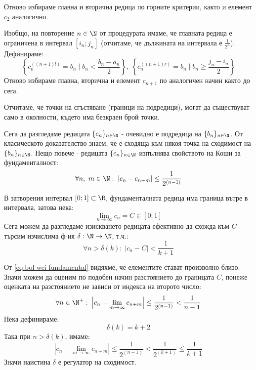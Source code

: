 \begin{solution}
    Отново избираме главна и вторична редица по горните критерии, както и елемент $c_2$ аналогично.

    Изобщо, на повторение $n \in \N$ от процедурата имаме, че главната редица е ограничена в интервал $[i_n; j_n]$ (отчитаме, че дължината на интервала е $\frac{1}{2^n}$). Дефинираме:
    \begin{equation}
        \left\{c^{((n+1)l)}_n = b_n \mid b_n < \frac{b_n-a_n}{2}\right\},\  \left\{c^{((n+1)r)}_n = b_n \mid b_n \geq \frac{j_n-i_n}{2}\right\}
    \end{equation}
    Отново избираме главна, вторична и елемент $c_{n+1}$ по аналогичен начин както до сега.

    Отчитаме, че точки на сгъстяване (граници на подредици), могат да съществуват само в околности, където има безкраен брой точки.
    
    Сега да разгледаме редицата $\{c_n\}_{n\in\N}$ - очевидно е подредица на $\{b_n\}_{n\in\N}$. От класическото доказателство знаем, че е сходяща към някоя точка на сходимост на $\{b_n\}_{n\in\N}$. Нещо повече - редицата $\{c_n\}_{n\in\N}$ изпълнява свойството на Коши за фундаменталност:
    \begin{equation}\label{eq:bol-wei-fundamental}
        \forall n,\ m\in \N:\; |c_n - c_{n+m}| \leq \frac{1}{2^{(n-1)}}
    \end{equation}

    В затворения интервал $[0;1] \subset \R$, фундаменталната редица има граница вътре в интервала, затова нека:
    \begin{equation}
        \lim\limits_{n\to\infty} c_n = C \in [0; 1]
    \end{equation}
    Сега можем да разгледаме изискването редицата ефективно да схожда към $C$ - търсим изчислима ф-ия $\delta :\N \to \N$, т.ч.:
    \begin{equation}
        \forall n>\delta(k):\; \left|c_n - C\right| < \frac{1}{k+1}
    \end{equation}

    От \eqref{eq:bol-wei-fundamental} видяхме, че елементите стават произволно близо. Значи можем да оценим по подобен начин разстоянието до границата $C$, понеже оценката на разстоянието не зависи от индекса на второто число:
    \begin{equation}
        \forall n\in\N^+:\; \left|c_n - \lim\limits_{m\to\infty} c_{n+m}\right| \leq \frac{1}{2^{(n-1)}} < \frac{1}{n-1}
    \end{equation}
    Нека дефинираме:
    \begin{equation}
        \delta(k) = k + 2
    \end{equation}
    Така при $n > \delta(k)$, имаме:
    \begin{equation}
        \left|c_n - \lim\limits_{m\to\infty} c_{n+m}\right| \leq \frac{1}{2^{(n-1)}} < \frac{1}{2^{(k+1)}} \leq \frac{1}{k+1}
    \end{equation}
    Значи наистина $\delta$ е регулатор на сходимост.
\end{solution}